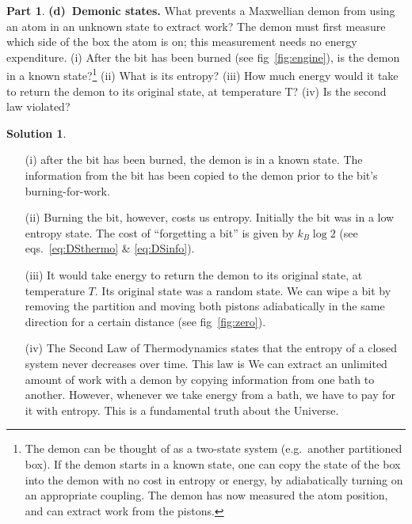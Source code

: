 \documentclass[11pt]{article}
\theoremstyle{definition}
\newtheorem{question}{Part}[section]
\newtheorem*{solution}{Solution}
\numberwithin{equation}{section}
\numberwithin{figure}{section}
\begin{document}
\begin{question}
\textbf{(d)~Demonic states.} What prevents a Maxwellian demon from using an atom in an unknown state to extract work? The demon must first measure which side of the box the atom is on; this measurement needs no energy expenditure. (i) After the bit has been burned (see fig~\ref{fig:engine}), is the demon in a known state?\footnote{The demon can be thought of as a two-state system (e.g.~another partitioned box). If the demon starts in a known state, one can copy the state of the box into the demon with no cost in entropy or energy, by adiabatically turning on an appropriate coupling. The demon has now measured the atom position, and can extract work from the pistons.}
(ii) What is its entropy? (iii) How much energy would it take to return the demon to its original state, at temperature T? (iv) Is the second law violated?
\end{question}

\begin{solution}
~\\
\begin{enumerate}
\item[(i)]  after the bit has been burned, the demon is in a known state. The information from the bit has been copied to the demon prior to the bit's burning-for-work.

\item[(ii)] Burning the bit, however, costs us entropy. Initially the bit was in a low entropy state. The cost of ``forgetting a bit'' is given by $\boxed{k_B \log{2}}$ (see eqs.~\ref{eq:DSthermo} \& \ref{eq:DSinfo}).

\item[(iii)] It would take  energy to return the demon to its original state, at temperature $T$. Its original state was a random state. We can wipe a bit by removing the partition and moving both pistons adiabatically in the same direction for a certain distance (see fig~\ref{fig:zero}).

\item[(iv)] The Second Law of Thermodynamics states that the entropy of a closed system never decreases over time. This law is  We can extract an unlimited amount of work with a demon by copying information from one bath to another. However, whenever we take energy from a bath, we have to pay for it with entropy. This is a fundamental truth about the Universe.
\end{enumerate}
\end{solution}
\end{document}
